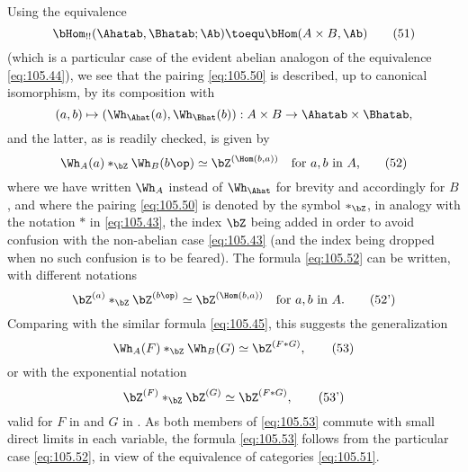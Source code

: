 Using the equivalence
\begin{equation}
  \label{eq:105.51}
  \bHom_{!!}(\Ahatab,\Bhatab;\Ab) \toequ \bHom(A\times B,\Ab)\tag{51}
\end{equation}
(which is a particular case of the evident abelian analogon of the
equivalence \eqref{eq:105.44}), we see that the pairing
\eqref{eq:105.50} is described, up to canonical isomorphism, by its
composition with
\[(a,b)\mapsto (\Wh_\Ahat(a),\Wh_\Bhat(b)): A\times B\to
\Ahatab\times\Bhatab,\]
and the latter, as is readily checked, is given by
\begin{equation}
  \label{eq:105.52}
  \Wh_A(a) *_{\bZ} \Wh_B(b\op) \simeq \bZ^{(\Hom(b,a))} \quad\text{for
    $a,b$ in $A$,}\tag{52}
\end{equation}
where we have written $\Wh_A$ instead of $\Wh_\Ahat$ for brevity and
accordingly for $B$, and where the pairing \eqref{eq:105.50} is
denoted by the symbol $*_{\bZ}$, in analogy with the notation $*$ in
\eqref{eq:105.43}, the index $\bZ$ being added in order to avoid
confusion with the non-abelian case \eqref{eq:105.43} (and the index
being dropped when no such confusion is to be feared). The formula
\eqref{eq:105.52} can be written, with different notations
\begin{equation}
  \label{eq:105.52prime}
  \bZ^{(a)} *_{\bZ} \bZ^{(b\op)} \simeq \bZ^{(\Hom(b,a))}
  \quad\text{for $a,b$ in $A$.}\tag{52'}
\end{equation}
Comparing with the similar formula \eqref{eq:105.45}, this suggests
the generalization
\begin{equation}
  \label{eq:105.53}
  \Wh_A(F) *_{\bZ} \Wh_B(G) \simeq \bZ^{(F*G)},\tag{53}
\end{equation}
or with the exponential notation
\begin{equation}
  \label{eq:105.53prime}
  \bZ^{(F)} *_{\bZ} \bZ^{(G)} \simeq \bZ^{(F*G)},\tag{53'}
\end{equation}
valid for $F$ in \Ahat{} and $G$ in \Bhat. As both members
of \eqref{eq:105.53} commute with small direct limits in each
variable, the formula \eqref{eq:105.53} follows from the particular
case \eqref{eq:105.52}, in view of the equivalence of categories
\eqref{eq:105.51}.

\medbreak


